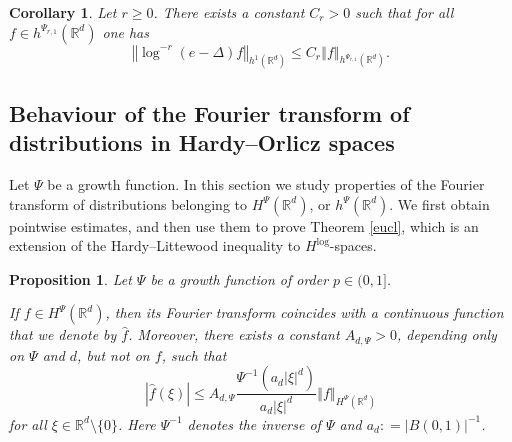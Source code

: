 \documentclass[a4paper, leqno, 10pt]{amsart}
\numberwithin{equation}{section}
\newtheorem{corollary}[thm]{Corollary}
\newtheorem{proposition}[thm]{Proposition}
\newcommand{\R}{\mathbb{R}}
\newcommand{\norm}[1]{\left\Vert#1\right\Vert}
\newcommand{\abs}[1]{\left|#1\right|}
\begin{document}
\begin{corollary} Let $r\geq 0$. There exists a constant $C_r >0$ such that for all $f\in h^{\Psi_{r,1}}(\R^d)$ one has
\[
	\norm{\log^{-r}(e-\Delta) f}_{h^1(\R^d)}\leq C_r  \norm{f}_{h^{\Psi_{r,1}}(\R^d)}.
\] 
\end{corollary}

%

\subsection{Behaviour of the Fourier transform of distributions in Hardy--Orlicz spaces}\label{behaviour}

Let $\Psi$ be a growth function. In this section we study properties of the Fourier transform of distributions belonging to  $H^{\Psi} (\R^d)$, or $h^{\Psi} (\R^d)$. We first obtain pointwise estimates, and then use them to prove Theorem \ref{eucl}, which is an extension of the  Hardy--Littewood inequality to $H^{\log}$-spaces. 

\begin{proposition}\label{FT_HO} Let $\Psi$ be a growth function of order $p \in (0,1]$.

If $f\in H^{\Psi} (\R^d)$, then its Fourier transform coincides with a continuous function that we denote by $\widehat{f}$. Moreover, there exists a constant $A_{d, \Psi}> 0$, depending only on $\Psi$ and $d$, but not on $f$, such that
\[
\abs{\widehat{f}(\xi)} \leq A_{d, \Psi}  \frac{ \Psi^{-1} (a_d \abs{ \xi }^d) }{a_d \abs{ \xi }^d} \norm{f}_{H^{\Psi} (\R^d)}
\]
for all $\xi \in \R^d \setminus \{ 0 \}$. Here $\Psi^{-1}$ denotes the inverse of $\Psi$ and $a_d : = \abs{B(0,1)}^{-1}$. 
\end{proposition}
\end{document}

